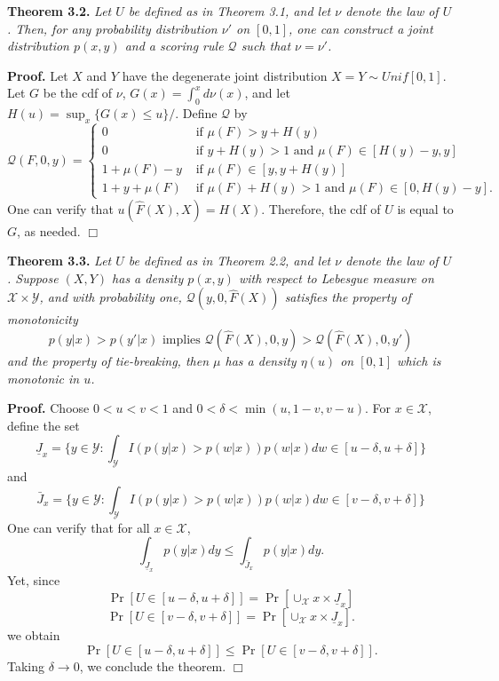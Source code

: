 \documentclass[12pt]{article}
\begin{document}
\noindent\textbf{Theorem 3.2.} \emph{ Let $U$ be defined as in Theorem
  3.1, and let $\nu$ denote the law of $U$.  Then, for any probability
  distribution $\nu'$ on $[0,1]$, one can construct a joint
  distribution $p(x, y)$ and a scoring rule $\mathcal{Q}$ such that 
  $\nu = \nu'$.
}

\noindent\textbf{Proof.}  
Let $X$ and $Y$ have the degenerate joint distribution $X= Y \sim Unif[0, 1]$.
Let $G$ be the cdf of $\nu$, $G(x) = \int_0^x d\nu(x)$, and let $H(u) = \sup_x \{G(x) \leq u\}/$.
Define $\mathcal{Q}$ by
\[
\mathcal{Q}(F, 0, y) = \begin{cases}
0 &\text{ if }\mu(F) > y + H(y)\\
0 & \text{ if }y + H(y) > 1 \text{ and }\mu(F) \in [H(y) - y, y]\\
1 + \mu(F) - y &\text{ if } \mu(F) \in [y, y + H(y)]\\
1 + y + \mu(F) &\text{ if }\mu(F) + H(y) > 1 \text{ and }\mu(F) \in [0, H(y) - y]. 
\end{cases}
\]
One can verify that $u(\hat{F}(X), X) = H(X).$  Therefore, the cdf of $U$ is equal to $G$, as needed. $\Box$\newline



\noindent\textbf{Theorem 3.3.} \emph{ Let $U$ be defined as in Theorem
  2.2, and let $\nu$ denote the law of $U$.  Suppose $(X, Y)$ has a density $p(x, y)$ with respect to 
  Lebesgue measure on $\mathcal{X} \times \mathcal{Y}$,
  and with probability one, $\mathcal{Q}(y, 0, \hat{F}(X))$ satisfies the property of monotonicity
  \[
  p(y|x) > p(y'|x) \text{ implies } \mathcal{Q}(\hat{F}(X), 0, y) > \mathcal{Q}(\hat{F}(X), 0, y')
  \]
  and the property of tie-breaking, %
  then $\mu$ has a density $\eta(u)$ on $[0, 1]$ which is monotonic in $u$.
}

\noindent\textbf{Proof.}
Choose $0 < u < v < 1$ and $0 < \delta < \min(u, 1-v, v-u)$.
For $x \in \mathcal{X}$, define the set 
\[
\underline{J}_x = \{y \in \mathcal{Y}: \int_\mathcal{Y} I(p(y|x) > p(w|x))p(w|x) dw \in [u - \delta, u + \delta]\}
\]
and
\[
\bar{J}_x = \{y \in \mathcal{Y}: \int_\mathcal{Y} I(p(y|x) > p(w|x))p(w|x) dw \in [v - \delta, v + \delta]\}
\]
One can verify that for all $x \in \mathcal{X}$,
\[
\int_{\underline{J}_x} p(y|x) dy \leq \int_{\bar{J}_x} p(y|x) dy.
\]
Yet, since
\[
\Pr[U \in [u-\delta, u + \delta]] = \Pr[\cup_\mathcal{X} x \times \underline{J}_x]
\]
\[
\Pr[U \in [v-\delta, v + \delta]] = \Pr[\cup_\mathcal{X} x \times \underline{J}_x].
\]
we obtain
\[
\Pr[U \in [u-\delta, u + \delta]] \leq \Pr[U \in [v - \delta, v + \delta]].
\]
Taking $\delta \to 0$, we conclude the theorem. $\Box$\newline
\end{document}
